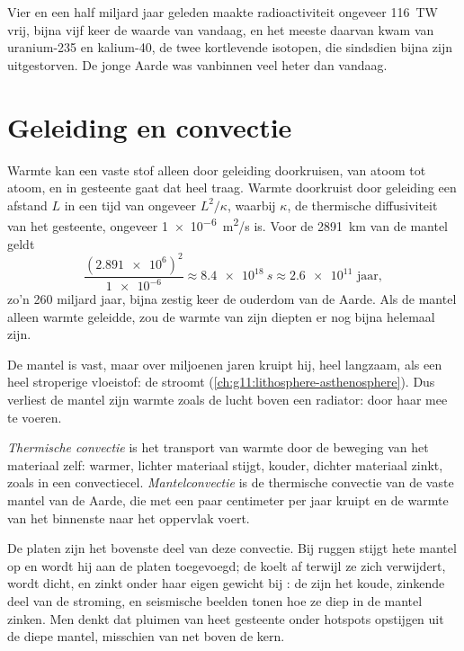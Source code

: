 Vier en een half miljard jaar geleden maakte radioactiviteit ongeveer
\qty{116}{TW} vrij, bijna vijf keer de waarde van vandaag, en het meeste daarvan kwam van
uranium-235 en kalium-40, de twee kortlevende isotopen, die sindsdien
bijna zijn uitgestorven. De jonge Aarde was vanbinnen veel heter dan vandaag.

\section{Geleiding en convectie}

Warmte kan een vaste stof alleen door geleiding doorkruisen, van atoom tot atoom, en in gesteente
gaat dat heel traag. Warmte doorkruist door geleiding een afstand $L$ in een tijd van
ongeveer $L^2/\kappa$, waarbij $\kappa$, de thermische diffusiviteit van het gesteente,
ongeveer \qty{1e-6}{m^2/s} is. Voor de
\qty{2891}{km} van de mantel geldt
\[
  \frac{(\num{2.891e6})^2}{\num{1e-6}} \approx \qty{8.4e18}{s} \approx
  \num{2.6e11} \text{ jaar},
\]
zo'n 260 miljard jaar, bijna zestig keer de ouderdom van de Aarde. Als de mantel
alleen warmte geleidde, zou de warmte van zijn diepten er nog bijna helemaal zijn.

De mantel is vast, maar over miljoenen jaren kruipt hij, heel langzaam, als
een heel stroperige vloeistof: de  stroomt (\cref{ch:g11:lithosphere-asthenosphere}).
Dus verliest de mantel zijn warmte zoals de lucht boven een radiator: door haar mee te voeren.

\begin{definition}\label{def:g12:internal-heat:convection}
\emph{Thermische convectie} is het transport van warmte
door de beweging van het materiaal zelf: warmer, lichter materiaal stijgt,
kouder, dichter materiaal zinkt, zoals in een convectiecel.
\emph{Mantelconvectie} is de thermische
convectie van de vaste mantel van de Aarde, die met een paar centimeter per
jaar kruipt en de warmte van het binnenste naar het oppervlak voert.
\end{definition}

De platen zijn het bovenste deel van deze convectie. Bij ruggen stijgt hete mantel
op en wordt hij aan de platen toegevoegd; de  koelt af terwijl ze zich verwijdert,
wordt dicht, en zinkt onder haar eigen gewicht bij : de 
zijn het koude, zinkende deel van de stroming, en seismische beelden tonen hoe ze
diep in de mantel zinken. Men denkt dat pluimen van heet gesteente onder
hotspots opstijgen uit de diepe mantel, misschien van net boven de kern.

